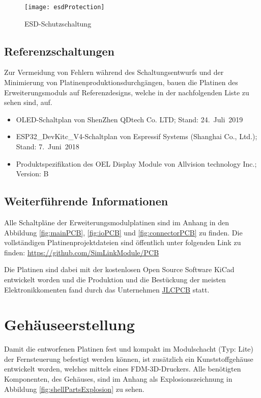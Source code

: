\begin{figure}[h]
    \centering
    \texttt{[image: esdProtection]}
    \caption{\ac{ESD}-Schutzschaltung}
    \label{fig:esdProtection}
\end{figure}

\subsection{Referenzschaltungen}
Zur Vermeidung von Fehlern während des Schaltungsentwurfs und der Minimierung von Platinenproduktionsdurchgängen, bauen die Platinen des Erweiterungsmoduls auf Referenzdesigns, welche in der nachfolgenden Liste zu sehen sind, auf.

\begin{itemize}
    \item \acs{OLED}-Schaltplan von ShenZhen QDtech Co. LTD; Stand: 24.~Juli~2019
    \item ESP32\_DevKitc\_V4-Schaltplan von Espressif Systems (Shanghai Co., Ltd.); Stand: 7.~Juni~2018
    \item Produktspezifikation des OEL Display Module von Allvision technology Inc.; Version: B
\end{itemize}

\subsection{Weiterführende Informationen}

Alle Schaltpläne der Erweiterungsmodulplatinen sind im Anhang in den Abbildung \ref{fig:mainPCB}, \ref{fig:ioPCB} und  \ref{fig:connectorPCB} zu finden. Die vollständigen Platinenprojektdateien sind öffentlich unter folgenden Link zu finden: \url{https://github.com/SimLinkModule/PCB}

Die Platinen sind dabei mit der kostenlosen Open Source Software KiCad \cite{aboutkicad} entwickelt worden und die Produktion und die Bestückung der meisten Elektronikkomenten fand durch das Unternehmen \href{https://jlcpcb.com/}{JLCPCB} statt.

\section{Gehäuseerstellung}
Damit die entworfenen Platinen fest und kompakt im Modulschacht (Typ: Lite) der Fernsteuerung befestigt werden können, ist zusätzlich ein Kunststoffgehäuse entwickelt worden, welches mittels eines \ac{FDM}-3D-Druckers. Alle benötigten Komponenten, des Gehäuses, sind im Anhang als Explosionszeichnung in Abbildung \ref{fig:shellPartsExplosion} zu sehen.

